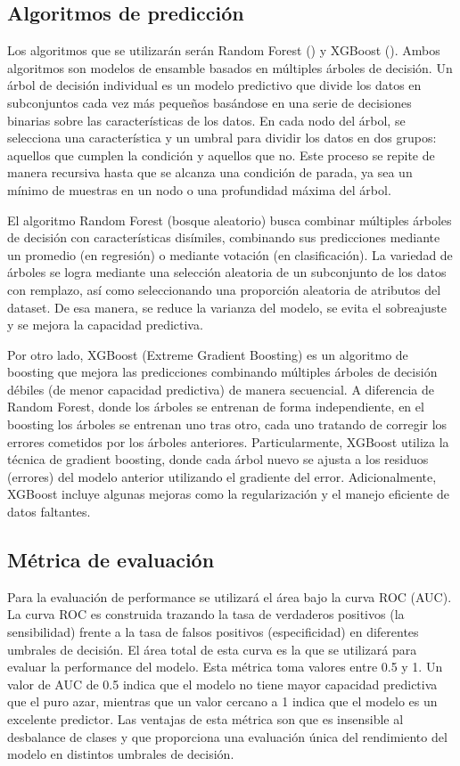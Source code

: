 \documentclass{article}
\begin{document}
\subsection{Algoritmos de predicción}
Los algoritmos que se utilizarán serán Random Forest (\cite{Bre01}) y XGBoost
(\cite{Che16}). Ambos algoritmos son modelos de ensamble basados en múltiples 
árboles de decisión. Un árbol de decisión individual es un modelo predictivo que divide 
los datos en subconjuntos cada vez más pequeños basándose en una serie de decisiones 
binarias sobre las características de los datos. En cada nodo del árbol, se selecciona una 
característica y un umbral para dividir los datos en dos grupos: aquellos que cumplen 
la condición y aquellos que no. Este proceso se repite de manera recursiva hasta que se 
alcanza una condición de parada, ya sea un mínimo de muestras en un nodo o una 
profundidad máxima del árbol.

El algoritmo Random Forest (bosque aleatorio) busca combinar 
múltiples árboles de decisión con características disímiles, combinando sus predicciones
mediante un promedio (en regresión) o mediante votación (en clasificación). 
La variedad de árboles se logra mediante una selección aleatoria de un subconjunto de los 
datos con remplazo, así como seleccionando una proporción aleatoria
de atributos del dataset. De esa manera, se reduce la varianza del modelo, se evita el
sobreajuste y se mejora la capacidad predictiva.

Por otro lado, XGBoost (Extreme Gradient Boosting) es un algoritmo de boosting que mejora 
las predicciones combinando múltiples árboles de decisión débiles (de menor capacidad 
predictiva) de manera secuencial. A diferencia de Random Forest, donde los árboles se 
entrenan de  forma independiente, en el boosting los árboles se entrenan uno tras otro, 
cada uno tratando de corregir los errores cometidos por los árboles anteriores. 
Particularmente, XGBoost utiliza la técnica de gradient boosting, donde cada árbol nuevo 
se ajusta a los residuos (errores) del modelo anterior utilizando el gradiente del error. 
Adicionalmente, XGBoost incluye algunas mejoras como la regularización
y el manejo eficiente de datos faltantes. 

\subsection{Métrica de evaluación}
Para la evaluación de performance se utilizará el área bajo la curva ROC 
(AUC). La curva ROC es construida trazando la tasa de verdaderos positivos (la 
sensibilidad) frente a la tasa de falsos positivos (especificidad) en diferentes umbrales 
de decisión. El área total de esta curva es la que se utilizará para evaluar la 
performance del modelo. Esta métrica toma valores entre 0.5 y 1. Un valor de AUC de 0.5 
indica que el modelo no tiene mayor capacidad predictiva que el puro azar, mientras que un 
valor cercano a 1 indica que el modelo es un excelente predictor. Las ventajas de 
esta métrica son que es insensible al desbalance de clases y que proporciona una evaluación
única del rendimiento del modelo en distintos umbrales de decisión.
\end{document}
